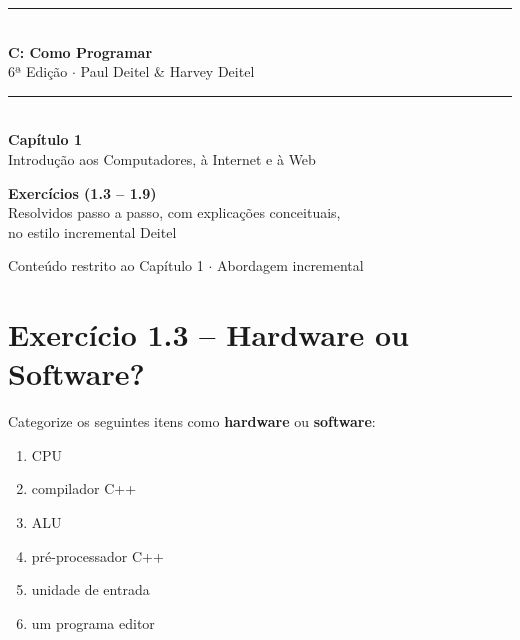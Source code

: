 \documentclass[12pt,a4paper]{article}
\begin{document}
\begin{titlepage}
  \centering
  \vspace*{2cm}
  {\color{deitelblue}\rule{\linewidth}{2pt}}\\[0.4cm]
  {\huge\bfseries\color{deitelblue} C: Como Programar}\\[0.2cm]
  {\large\color{deitelblue} 6ª Edição $\cdot$ Paul Deitel \& Harvey Deitel}\\[0.2cm]
  {\color{deitelblue}\rule{\linewidth}{2pt}}\\[1cm]
  {\LARGE\bfseries Capítulo 1}\\[0.3cm]
  {\Large\color{deitelblue!80} Introdução aos Computadores, à Internet e à Web}\\[0.8cm]
  \begin{tcolorbox}[colback=deitellightblue,colframe=deitelblue,width=0.8\linewidth]
    \centering
    {\large\bfseries Exercícios (1.3 -- 1.9)}\\[0.2cm]
    {\normalsize Resolvidos passo a passo, com explicações conceituais,\\
    no estilo incremental Deitel}
  \end{tcolorbox}
  \vfill
  {\small Conteúdo restrito ao Capítulo 1 $\cdot$ Abordagem incremental}
\end{titlepage}

\tableofcontents
\newpage

\section{Exercício 1.3 -- Hardware ou Software?}

\begin{enunciadoBox}[Enunciado]
Categorize os seguintes itens como \textbf{hardware} ou \textbf{software}:
\begin{enumerate}
  \item CPU
  \item compilador C++
  \item ALU
  \item pré-processador C++
  \item unidade de entrada
  \item um programa editor
\end{enumerate}
\end{enunciadoBox}

\bigskip
\end{document}
